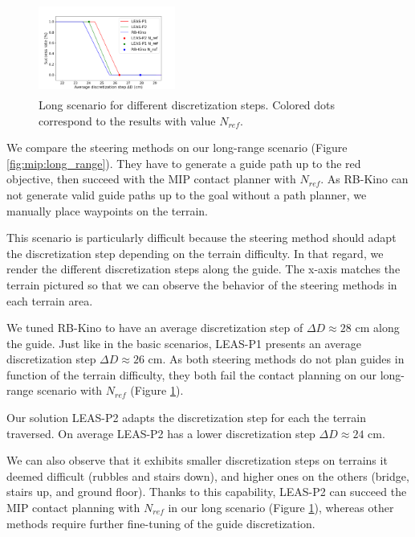 \begin{figure}[ht]
    \centering
    \includegraphics[trim={0cm 0cm 2cm 1.7cm}, clip,width=0.4\textwidth, height=3cm]{Figures/Chapter_MIP_SL1M/res_mip/MIP_res_long/FIGURE_MIP_LONG_2.png}
    \caption{Long scenario for different discretization steps. Colored dots correspond to the results with value $N_{ref}$.}
    \label{fig:mip:long_range:res}
\end{figure}

We compare the steering methods on our long-range scenario (Figure \ref{fig:mip:long_range}).
They have to generate a guide path up to the red objective, then succeed with the MIP contact planner with $N_{ref}$.
As RB-Kino can not generate valid guide paths up to the goal without a path planner, we manually place waypoints on the terrain.

This scenario is particularly difficult because the steering method should adapt the discretization step depending on the terrain difficulty.
In that regard, we render the different discretization steps along the guide.
The x-axis matches the terrain pictured so that we can observe the behavior of the steering methods in each terrain area.

We tuned RB-Kino to have an average discretization step of $\Delta D \approx 28$ cm along the guide.
Just like in the basic scenarios, LEAS-P1 presents an average discretization step $\Delta D \approx 26$ cm.
As both steering methods do not plan guides in function of the terrain difficulty, they both fail the contact planning on our long-range scenario with $N_{ref}$ (Figure \ref{fig:mip:long_range:res}).

Our solution LEAS-P2 adapts the discretization step for each the terrain traversed.%
On average LEAS-P2 has a lower discretization step $\Delta D \approx 24$ cm.

We can also observe that it exhibits smaller discretization steps on terrains it deemed difficult (rubbles and stairs down), and higher ones on the others (bridge, stairs up, and ground floor).
Thanks to this capability, LEAS-P2 can succeed the MIP contact planning with $N_{ref}$ in our long scenario (Figure \ref{fig:mip:long_range:res}), whereas other methods require further fine-tuning of the guide discretization.



